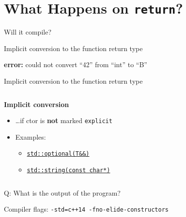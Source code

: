 \section{What Happens on \texttt{return}?}

\begin{frame}[fragile]{Will it compile?}
\end{frame}

\addtocounter{framenumber}{-1}
\begin{frame}[fragile]{Implicit conversion to the function return type}

    \textbf{\textcolor{vertexDarkRed}{error:}} could not convert \enquote{42} from \enquote{int} to \enquote{B}
\end{frame}

\begin{frame}[fragile]{Implicit conversion to the function return type}
    \begin{columns}
        \begin{column}{.55\textwidth}
            \textbf{Implicit conversion}
            \begin{itemize}
                \item \ldots if ctor is \textbf{not} marked \texttt{explicit}
                \item Examples: 
                \begin{itemize}
                    \item \href{https://en.cppreference.com/w/cpp/utility/optional/optional}{\texttt{std::optional(T\&\&)}}
                    \item \href{https://en.cppreference.com/w/cpp/string/basic_string/basic_string}{\texttt{std::string(const char*)}}
                \end{itemize}
            \end{itemize}
        \end{column}
        \begin{column}{.35\textwidth}
        \end{column}
    \end{columns}
\end{frame}

\begin{frame}[fragile]{Q: What is the output of the program?}
    \begin{center}
        Compiler flags: \texttt{-std=c++14 -fno-elide-constructors}
    \end{center}

\end{frame}

